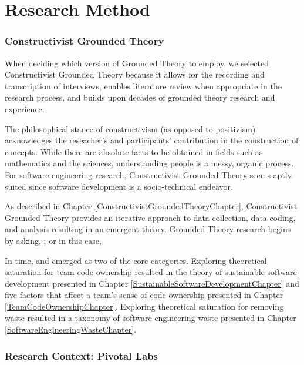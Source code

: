 

\chapter{Research Method}
\label{ResearchMethodChapter}
\label{ResearchMethod}


\subsection{Constructivist Grounded Theory}


When deciding which version of Grounded Theory to employ, we selected Constructivist Grounded Theory \cite{Charmaz} because it allows for the recording and transcription of interviews, enables literature review when appropriate in the research process, and builds upon decades of grounded theory research and experience.


The philosophical stance of constructivism (as opposed to positivism) acknowledges the reseacher's and participants' contribution in the construction of concepts. 
While there are absolute facts to be obtained in fields such as mathematics and the sciences, understanding people is a messy, organic process. For software engineering research, Constructivist Grounded Theory seems aptly suited since software development is a socio-technical endeavor.


As described in Chapter \ref{ConstructivistGroundedTheoryChapter}, Constructivist Grounded Theory provides an iterative approach to data collection, data coding, and analysis resulting in an emergent theory. Grounded Theory research begins by asking,  \cite{GlaserTheoreticalSensitivity}; or in this case,  


In time,  and  emerged as two of the core categories. Exploring theoretical saturation for team code ownership resulted in the theory of sustainable software development presented in Chapter \ref{SustainableSoftwareDevelopmentChapter} and five factors that affect a team's sense of code ownership presented in Chapter \ref{TeamCodeOwnershipChapter}. Exploring theoretical saturation for removing waste resulted in a taxonomy of software  engineering waste presented in Chapter \ref{SoftwareEngineeringWasteChapter}.


\subsection{Research Context: Pivotal Labs}
\label{SustainableSoftwareDevelopmentResearchContext}


